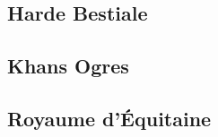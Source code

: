 \subsection{Harde Bestiale}
\setcounter{Qcounter}{0}

%


\subsection{Khans Ogres}
\setcounter{Qcounter}{0}



\subsection{Royaume d'Équitaine}
\setcounter{Qcounter}{0}

%
%



